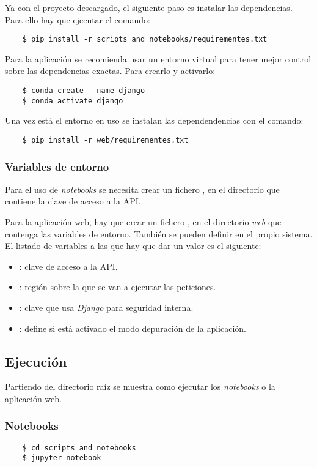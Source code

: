 Ya con el proyecto descargado, el siguiente paso es instalar las dependencias. Para ello hay que ejecutar el comando:
\begin{lstlisting}
	$ pip install -r scripts and notebooks/requirementes.txt
\end{lstlisting}
Para la aplicación se recomienda usar un entorno virtual para tener mejor control sobre las dependencias exactas. Para crearlo y activarlo:
\begin{lstlisting}
	$ conda create --name django
	$ conda activate django
\end{lstlisting}
Una vez está el entorno en uso se instalan las dependendencias con el comando:
\begin{lstlisting}
	$ pip install -r web/requirementes.txt
\end{lstlisting}

\subsubsection{Variables de entorno}
Para el uso de \textit{notebooks} se necesita crear un fichero , en el directorio  que contiene la clave de acceso a la API.

Para la aplicación web, hay que crear un fichero , en el directorio \textit{web} que contenga las variables de entorno. También se pueden definir en el propio sistema. El listado de variables a las que hay que dar un valor es el siguiente:
\begin{itemize}
	\item {}: clave de acceso a la API.
	\item {}: región sobre la que se van a ejecutar las peticiones.
	\item {}: clave que usa \textit{Django} para seguridad interna.
	\item {}: define si está activado el modo depuración de la aplicación.
\end{itemize}

\subsection{Ejecución}
Partiendo del directorio raíz se muestra como ejecutar los \textit{notebooks} o la aplicación web.
\subsubsection{Notebooks}
\begin{lstlisting}
	$ cd scripts and notebooks
	$ jupyter notebook
\end{lstlisting}
